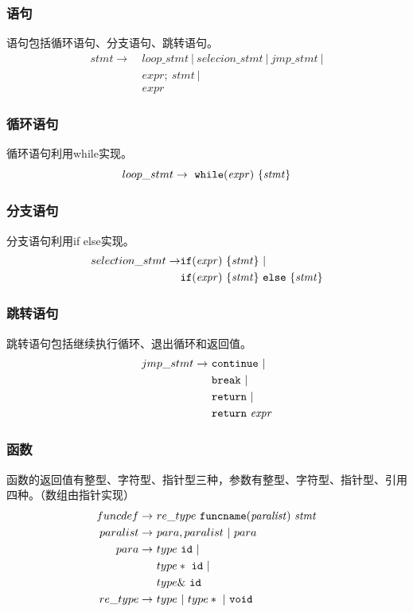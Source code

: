 \documentclass[UTF8,a4paper,10pt]{ctexart}
\begin{document}
\subsubsection{语句}
语句包括循环语句、分支语句、跳转语句。
\begin{align*}
stmt\rightarrow\ &loop\_stmt \ |\ selecion\_stmt \ |\ jmp\_stmt \ |\\ 
&expr;\ stmt\ | \\
&expr\ 
\end{align*}
\subsubsection{循环语句}
循环语句利用while实现。
$$
loop\_stmt \rightarrow \ \tt{while}\it{(expr)}\ \it{\{stmt\}}
$$
\subsubsection{分支语句}
分支语句利用if else实现。
\begin{align*}
selection\_stmt \rightarrow &\tt{if}(\it{expr})\ \{stmt\} \ | \\
&\tt{if}(\it{expr})\ \{stmt\}\ \tt{else} \ \it{\{stmt\}}
\end{align*}
\subsubsection{跳转语句}
跳转语句包括继续执行循环、退出循环和返回值。
\begin{align*}
jmp\_stmt \rightarrow\ &\tt{continue}\ |\\
&\tt{break} \ |\\
&\tt{return} \ |\\
&\tt{return}\ \it{expr}
\end{align*}
\subsubsection{函数} 
函数的返回值有整型、字符型、指针型三种，参数有整型、字符型、指针型、引用四种。（数组由指针实现）
\begin{align*}
funcdef \rightarrow\ &re\_type\ \tt{funcname}\it{(paralist)\ stmt}\\
paralist \rightarrow\ & para, paralist \ |\ para\\
para \rightarrow\ &type\ \tt{id}\ | \\
&type* \ \tt{id}\ | \\
&type\& \ \tt{id}\ \\
re\_type \rightarrow \ &type\ |\ type*\ |\ \tt{void}
\end{align*}
\end{document}

